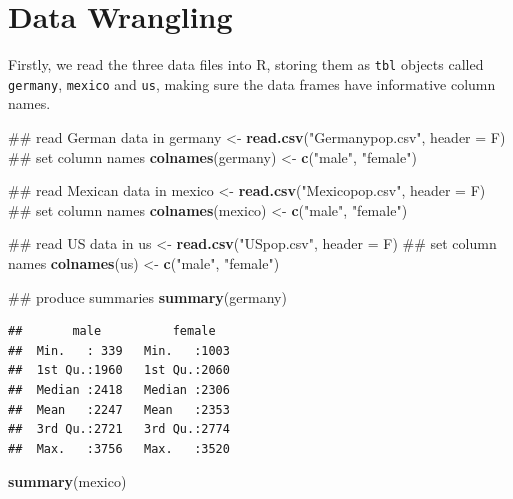 \documentclass[]{book}
\newenvironment{Shaded}{\begin{snugshade}}{\end{snugshade}}
\newcommand{\KeywordTok}[1]{\textcolor[rgb]{0.13,0.29,0.53}{\textbf{{#1}}}}
\newcommand{\DataTypeTok}[1]{\textcolor[rgb]{0.13,0.29,0.53}{{#1}}}
\newcommand{\StringTok}[1]{\textcolor[rgb]{0.31,0.60,0.02}{{#1}}}
\newcommand{\NormalTok}[1]{{#1}}
\theoremstyle{definition}
\theoremstyle{definition}
\theoremstyle{definition}
\theoremstyle{remark}
\begin{document}
\section{Data Wrangling}\label{data-wrangling-1}

Firstly, we read the three data files into R, storing them as
\texttt{tbl} objects called \texttt{germany}, \texttt{mexico} and
\texttt{us}, making sure the data frames have informative column names.

\begin{Shaded}
\begin{Highlighting}[]
\NormalTok{## read German data in}
\NormalTok{germany <-}\StringTok{ }\KeywordTok{read.csv}\NormalTok{(}\StringTok{"Germanypop.csv"}\NormalTok{, }\DataTypeTok{header =} \NormalTok{F)}
\NormalTok{## set column names}
\KeywordTok{colnames}\NormalTok{(germany) <-}\StringTok{ }\KeywordTok{c}\NormalTok{(}\StringTok{"male"}\NormalTok{, }\StringTok{"female"}\NormalTok{)}

\NormalTok{## read Mexican data in}
\NormalTok{mexico <-}\StringTok{ }\KeywordTok{read.csv}\NormalTok{(}\StringTok{"Mexicopop.csv"}\NormalTok{, }\DataTypeTok{header =} \NormalTok{F)}
\NormalTok{## set column names}
\KeywordTok{colnames}\NormalTok{(mexico) <-}\StringTok{ }\KeywordTok{c}\NormalTok{(}\StringTok{"male"}\NormalTok{, }\StringTok{"female"}\NormalTok{)}

\NormalTok{## read US data in}
\NormalTok{us <-}\StringTok{ }\KeywordTok{read.csv}\NormalTok{(}\StringTok{"USpop.csv"}\NormalTok{, }\DataTypeTok{header =} \NormalTok{F)}
\NormalTok{## set column names}
\KeywordTok{colnames}\NormalTok{(us) <-}\StringTok{ }\KeywordTok{c}\NormalTok{(}\StringTok{"male"}\NormalTok{, }\StringTok{"female"}\NormalTok{)}

\NormalTok{## produce summaries}
\KeywordTok{summary}\NormalTok{(germany)}
\end{Highlighting}
\end{Shaded}

\begin{verbatim}
##       male          female    
##  Min.   : 339   Min.   :1003  
##  1st Qu.:1960   1st Qu.:2060  
##  Median :2418   Median :2306  
##  Mean   :2247   Mean   :2353  
##  3rd Qu.:2721   3rd Qu.:2774  
##  Max.   :3756   Max.   :3520
\end{verbatim}

\begin{Shaded}
\begin{Highlighting}[]
\KeywordTok{summary}\NormalTok{(mexico)}
\end{Highlighting}
\end{Shaded}
\end{document}

